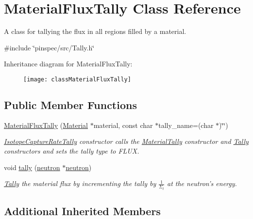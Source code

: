 \hypertarget{classMaterialFluxTally}{\section{Material\-Flux\-Tally Class Reference}
\label{classMaterialFluxTally}
}


A class for tallying the flux in all regions filled by a material.  




{\ttfamily \#include \char`\"{}pinspec/src/\-Tally.\-h\char`\"{}}

Inheritance diagram for Material\-Flux\-Tally\-:\begin{figure}[H]
\begin{center}
\leavevmode
\texttt{[image: classMaterialFluxTally]}
\end{center}
\end{figure}
\subsection*{Public Member Functions}
\begin{DoxyCompactItemize}
\item 
\hyperlink{classMaterialFluxTally_ab1deeebac35f38d8f3c56f1b5c4b0eb5}{Material\-Flux\-Tally} (\hyperlink{classMaterial}{Material} $\ast$material, const char $\ast$tally\-\_\-name=(char $\ast$)\char`\"{}\char`\"{})
\begin{DoxyCompactList}\small\item\em \hyperlink{classIsotopeCaptureRateTally}{Isotope\-Capture\-Rate\-Tally} constructor calls the \hyperlink{classMaterialTally}{Material\-Tally} constructor and \hyperlink{classTally}{Tally} constructors and sets the tally type to F\-L\-U\-X. \end{DoxyCompactList}\item 
void \hyperlink{classMaterialFluxTally_a458d77b55dbd6bd0fb5efeb2ffec2e9b}{tally} (\hyperlink{structneutron}{neutron} $\ast$\hyperlink{structneutron}{neutron})
\begin{DoxyCompactList}\small\item\em \hyperlink{classTally}{Tally} the material flux by incrementing the tally by $ \frac{1}{\Sigma_t} $ at the neutron's energy. \end{DoxyCompactList}\end{DoxyCompactItemize}
\subsection*{Additional Inherited Members}



